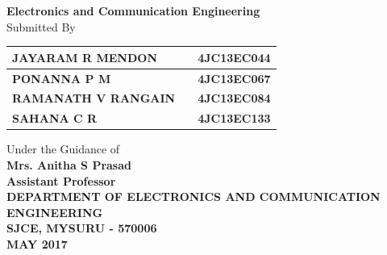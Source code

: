 \begin{center}
{\textbf{Electronics and Communication Engineering}}\\
\vspace{0.2cm}
Submitted By\\
\begin{table}[h]
\centering
\large{
\begin{tabular}{| >{\bfseries} l | c>{\bfseries}r|}
\hline
JAYARAM R MENDON & & 4JC13EC044\\\hline PONANNA P M & & 4JC13EC067\\\hline RAMANATH V RANGAIN & & 4JC13EC084\\\hline SAHANA C R & & 4JC13EC133\\
\hline
\end{tabular}}
\end{table}
Under the Guidance of\\
\large{\textbf{Mrs. Anitha S Prasad}}\\
\large{\textbf{Assistant Professor}}\\[0.5cm]
\large{\textbf{DEPARTMENT OF ELECTRONICS AND COMMUNICATION ENGINEERING}}\\
\large{\textbf{SJCE, MYSURU - 570006}}\\
\vspace{0.3cm}
\large\textbf{{MAY 2017}}
\newpage
\end{center}